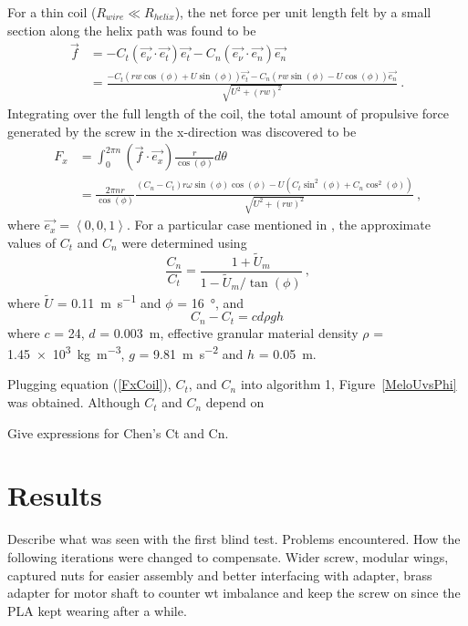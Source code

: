 \documentclass[letterpaper, 11 pt]{article}
\begin{document}
For a thin coil ($R_{wire} \ll R_{helix}$), the net force per unit length felt by a small section along the helix path was found to be 
\begin{equation}\label{f}
\begin{split} 
\vec{f} &= -C_t(\vec{e_\nu}\cdot\vec{e_t})\vec{e_t}-C_n(\vec{e_\nu}\cdot\vec{e_n})\vec{e_n} \\
&=\frac{-C_t(rw\cos(\phi)+U\sin(\phi))\vec{e_t}-C_n(rw\sin(\phi)-U\cos(\phi))\vec{e_n}}{\sqrt{U^2+(rw)^2}}\ \text{.}
\end{split} 
\end{equation}
Integrating over the full length of the coil, the total amount of propulsive force generated by the screw in the x-direction was discovered to be  
\begin{equation}\label{FxCoil}
\begin{split}
F_x &= \int_{0}^{2 \pi n}(\vec{f}\cdot\vec{e_x})\frac{r}{\cos(\phi)}d\theta \\
&=\frac{2\pi nr}{\cos(\phi)}\frac{(C_n-C_t)r\omega\sin(\phi)\cos(\phi)-U(C_t\sin^2(\phi)+C_n\cos^2(\phi))}{\sqrt{U^2+(rw)^2}}\ \text{,}
\end{split}
\end{equation}
where $\vec{e_x} = \left\langle 0,0,1 \right\rangle $. For a particular case mentioned in \cite{Melo}, the approximate values of $C_t$ and $C_n$ were determined using 
\begin{equation}
\frac{C_n}{C_t} = \frac{1+\tilde{U}_m}{1-\tilde{U}_m/\tan(\phi)}\ \text{,}
\end{equation}
where $\tilde{U}$ = \SI[per-mode=fraction]{0.11}{\m\per\s} and $\phi$ = \SI{16}{\degree}, and 
\begin{equation}
C_n - C_t = cd\rho gh
\end{equation} 
where $c$ = 24, $d$ = \SI{0.003}{\m}, effective granular material density $\rho$ = \SI[per-mode=fraction]{1.45e3}{\kg\per\m^3}, $g$ = \SI[per-mode=fraction]{9.81}{\m\per\s^2} and $h$ = \SI{0.05}{\m}.

Plugging equation (\ref{FxCoil}), $C_t$, and $C_n$ into algorithm 1, Figure~\ref{MeloUvsPhi} was obtained. Although $C_t$ and $C_n$ depend on    

Give expressions for Chen's Ct and Cn. 


\section{Results}
Describe what was seen with the first blind test. Problems encountered. 
How the following iterations were changed to compensate. 
Wider screw, modular wings, captured nuts for easier assembly and better interfacing with adapter, brass adapter for motor shaft to counter wt imbalance and keep the screw on since the PLA kept wearing after a while. 
\end{document}
